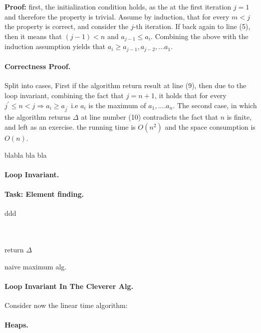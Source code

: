 \textbf{Proof:} first, the initialization condition holds, as the at the first iteration \(j=1\) and therefore the property is trivial.
Assume by induction, that for every \(m < j\) the property is correct, and consider the \(j\)-th iteration. If back again to line (5), then it means that \( (j-1) < n\) and \( a_{j-1} \le a_{i} \). Combining the above with the induction assumption yields that \(a_i \ge a_{j-1},a_{j-2}, ... a_{1}\).    

\paragraph{Correctness Proof.} Split into cases, First if the algorithm return result at line (9), then due to the loop invariant, combining the fact that \( j = n + 1\), it holds that for every \(j^\prime  \le n < j \Rightarrow a_i \ge a_{j^\prime} \)  i.e \(a_i\) is the maximum of \(a_1, .... a_n \). The second case, in which the algorithm returns \( \Delta \) at line number (10) contradicts the fact that \(n\) is finite, and left as an exercise.  the running time is \( O(n^2) \) and the space consumption is \(O(n)\). 



blabla bla bla

\paragraph{Loop Invariant.}


\paragraph{Task: Element finding.} ddd


\begin{algorithm}[H]
{}
 \ \\ 
  { 
        \ \\ 
    } 
    return \( \Delta \) 
    \caption{naive maximum alg.}
\end{algorithm}

\paragraph{Loop Invariant In The Cleverer Alg.} Consider now the linear time algorithm:



\paragraph{Heaps.}




